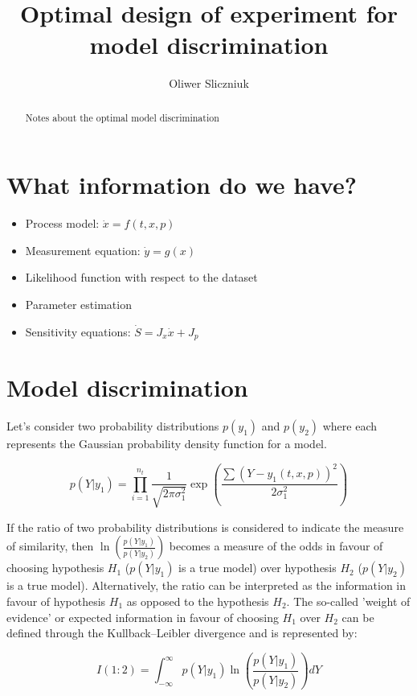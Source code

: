 \documentclass[]{scrartcl}
\title{Optimal design of experiment for model discrimination}
\author{Oliwer Sliczniuk}
\begin{document}
\maketitle

\begin{abstract}
Notes about the optimal model discrimination
\end{abstract}

\section{What information do we have?}

\begin{itemize}
	\item Process model: $\dot{x}=f(t,x,p)$
	\item Measurement equation: $\dot{y}=g(x)$
	\item Likelihood function with respect to the dataset
	\item Parameter estimation
	\item Sensitivity equations: $\dot{S} = J_x \dot{x} + J_p$
\end{itemize}

\section{Model discrimination}

Let's consider two probability distributions $p(y_1)$ and $p(y_2)$ where each represents the Gaussian probability density function for a model.

\begin{equation}
	p(Y|y_1) = \prod_{i=1}^{n_t} \frac{1}{\sqrt{2\pi\sigma_1^2}} \exp \left( \frac{\sum \left(Y - y_1(t,x,p)\right)^2}{2\sigma_1^2} \right)
\end{equation}

If the ratio of two probability distributions is considered to indicate the measure of similarity, then $\ln \left(\frac{p(Y|y_1)}{p(Y|y_2)}\right)$ becomes a measure of the odds in favour of choosing hypothesis $H_1$ ($p(Y|y_1)$ is a true model) over hypothesis $H_2$ ($p(Y|y_2)$ is a true model). Alternatively, the ratio can be interpreted as the information in favour of hypothesis $H_1$ as opposed to the hypothesis $H_2$. The so-called 'weight of evidence' or expected information in favour of choosing $H_1$ over $H_2$ can be defined through the Kullback–Leibler divergence and is represented by:

\begin{equation}
	I(1:2) = \int_{-\infty}^{\infty} p(Y|y_1) \ln \left(\frac{p(Y|y_1)}{p(Y|y_2)}\right) dY 
\end{equation}
\end{document}

